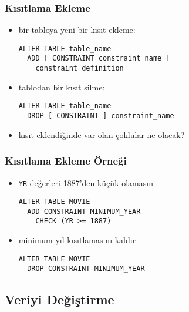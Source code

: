 \documentclass[dvipsnames]{beamer}
\theoremstyle{plain}
\begin{document}
\begin{frame}[fragile]
  \frametitle{Kısıtlama Ekleme}
  
  \begin{itemize}
    \item bir tabloya yeni bir kısıt ekleme:
    \begin{lstlisting}
ALTER TABLE table_name
  ADD [ CONSTRAINT constraint_name ]
    constraint_definition
    \end{lstlisting}

   \item tablodan bir kısıt silme:
    \begin{lstlisting}
ALTER TABLE table_name
  DROP [ CONSTRAINT ] constraint_name
    \end{lstlisting}

    \pause
    \item kısıt eklendiğinde var olan çoklular ne olacak?
  \end{itemize}
\end{frame}

\begin{frame}[fragile]
  \frametitle{Kısıtlama Ekleme Örneği}
  
  \begin{itemize}
    \item \texttt{YR} değerleri 1887'den küçük olamasın
    \begin{lstlisting}
ALTER TABLE MOVIE
  ADD CONSTRAINT MINIMUM_YEAR
    CHECK (YR >= 1887)
    \end{lstlisting}
  \end{itemize}

  \begin{itemize}
    \item minimum yıl kısıtlamasını kaldır
    \begin{lstlisting}
ALTER TABLE MOVIE
  DROP CONSTRAINT MINIMUM_YEAR
    \end{lstlisting}
  \end{itemize}
\end{frame}

\subsection{Veriyi Değiştirme}
\end{document}
